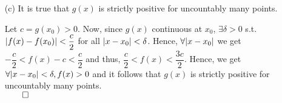 \documentclass[11pt]{article}
\DeclarePairedDelimiter\abs{\lvert}{\rvert}%
\begin{document}
\begin{itemize}
\begin{itemize}
            \item[(c)]
                It is true that $g(x)$ is strictly positive for uncountably
                many points.

                Let $c = g(x_0) > 0$. Now, since $g(x)$ continuous at $x_0$,
                $\exists \delta > 0$ s.t. $\abs{f(x) - f(x_0)} < \dfrac{c}{2}$
                for all $\abs{x - x_0} < \delta$. Hence, $\forall \abs{x -
                x_0}$ we get $-\dfrac{c}{2} < f(x) - c < \dfrac{c}{2}$ and
                thus, $\dfrac{c}{2} < f(x) < \dfrac{3c}{2}$. Hence, we get
                $\forall \abs{x - x_0} < \delta, f(x) > 0$ and it follows that
                $g(x)$ is strictly positive for uncountably many points.\\
                $\qed$
        \end{itemize}
\end{itemize}

\end{document}
